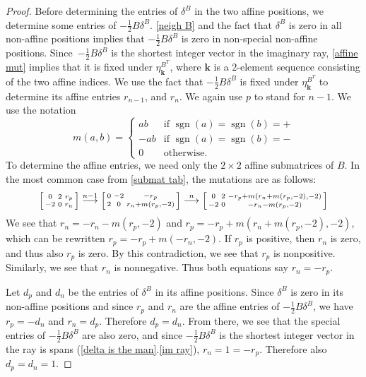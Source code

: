 \documentclass{amsart}
\theoremstyle{definition}
\theoremstyle{remark}
\numberwithin{equation}{section}
\newcommand{\sgn}{\operatorname{sgn}}
\newcommand{\0}{{\mathbf{0}}}
\newcommand{\kk}{{\boldsymbol{k}}}
\begin{document}
\begin{proof}
Before determining the entries of $\delta^B$ in the two affine positions, we determine some entries of $-\frac12B\delta^B$.
\cref{neigh B} and the fact that $\delta^B$ is zero in all non-affine positions implies that $-\frac12B\delta^B$ is zero in non-special non-affine positions.
Since~$-\frac12B\delta^B$ is the shortest integer vector in the imaginary ray, \cref{affine mut} implies that it is fixed under $\eta^{B^T}_\kk$, where $\kk$ is a $2$-element sequence consisting of the two affine indices. 
We use the fact that $-\frac12B\delta^B$ is fixed under $\eta^{B^T}_\kk$ to determine its affine entries $r_{n-1}$, and $r_n$.
We again use $p$ to stand for $n-1$.
We use the notation 
\[m(a,b)=\begin{cases}
ab&\text{if }\sgn(a)=\sgn(b)=+\\
-ab&\text{if }\sgn(a)=\sgn(b)=-\\
0&\text{otherwise}.
\end{cases}\]
To determine the affine entries, we need only the $2\times2$ affine submatrices of $B$.
In the most common case from \cref{submat tab}, the mutations are as follows:
\[
\begin{bsmallmatrix*}
0 & 2 & r_p\\
-2 & 0 & r_n
\end{bsmallmatrix*}\overset{n-1}{\longrightarrow}
\begin{bsmallmatrix*}
0 & -2 & -r_p\\
2 & 0 & r_n+m(r_p,-2)
\end{bsmallmatrix*}\overset{n}{\longrightarrow}
\begin{bsmallmatrix*}
0 & 2 & -r_p+m(r_n+m(r_p,-2),-2)\\
-2 & 0 & -r_n-m(r_p,-2)
\end{bsmallmatrix*}
\]
We see that $r_n=-r_n-m(r_p,-2)$ and $r_p=-r_p+m(r_n+m(r_p,-2),-2)$, which can be rewritten $r_p=-r_p+m(-r_n,-2)$.
If $r_p$ is positive, then $r_n$ is zero, and thus also $r_p$ is zero.
By this contradiction, we see that $r_p$ is nonpositive.
Similarly, we see that $r_n$ is nonnegative.
Thus both equations say $r_n=-r_p$.

Let $d_p$ and $d_n$ be the entries of $\delta^B$ in its affine positions.
Since $\delta^B$ is zero in its non-affine positions and since $r_p$ and $r_n$ are the affine entries of $-\frac12B\delta^B$, we have $r_p=-d_n$ and $r_n=d_p$.
Therefore $d_p=d_n$.
From there, we see that the special entries of $-\frac12B\delta^B$ are also zero, and since $-\frac12B\delta^B$ is the shortest integer vector in the ray is spans (\cref{delta is the man}.\ref{im ray}), $r_n=1=-r_p$.
Therefore also $d_p=d_n=1$.


\end{proof}
\end{document}
